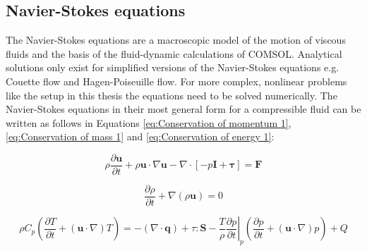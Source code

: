 \subsection{Navier-Stokes equations}
\label{subsec:Navier_Stokes}
The Navier-Stokes equations are a macroscopic model of the motion of viscous fluids and the basis of the fluid-dynamic calculations of COMSOL. Analytical solutions only exist for simplified versions of the Navier-Stokes equations e.g. Couette flow and Hagen-Poiseuille flow. For more complex, nonlinear problems like the setup in this thesis the equations need to be solved numerically. The Navier-Stokes equations in their most general form for a compressible fluid can be written as follows in Equations \ref{eq:Conservation of momentum 1}, \ref{eq:Conservation of mass 1} and \ref{eq:Conservation of energy 1}:


\begin{equation}
\rho\frac{\partial \boldsymbol u}{\partial t} + \rho\boldsymbol u\cdotp\nabla\boldsymbol u - \nabla\cdotp[-p\boldsymbol I + \boldsymbol \tau] = \boldsymbol F
\label{eq:Conservation of momentum 1}
\end{equation}


\begin{equation}
\frac{\partial\rho}{\partial t}+\nabla(\rho\boldsymbol u) = 0
\label{eq:Conservation of mass 1}
\end{equation}

\begin{equation}
\rho C_{p}\left(\frac{\partial T}{\partial t}+(\boldsymbol u \cdotp\nabla)T\right) = -(\nabla\cdotp\boldsymbol q)+\tau:\boldsymbol S -\frac{T}{\rho}\left.\frac{\partial p}{\partial t}\right\vert_{p}\left(\frac{\partial p}{\partial t}+(\boldsymbol u\cdotp\nabla)p\right)+Q 
\label{eq:Conservation of energy 1}
\end{equation}

